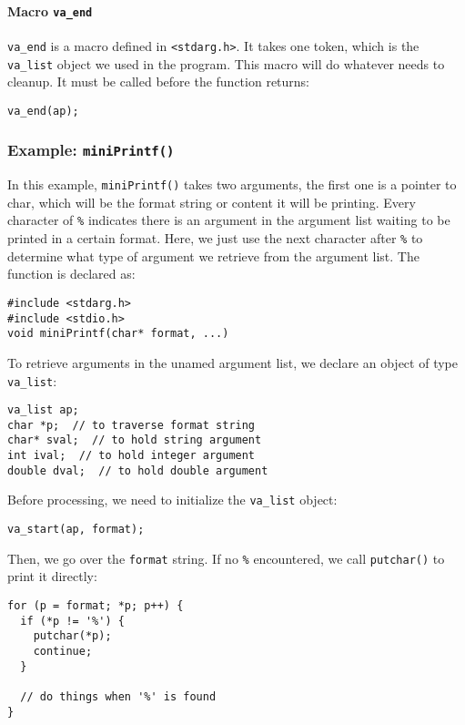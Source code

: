 \documentclass[11pt]{article}
\begin{document}
\paragraph{Macro \texttt{va\_end}}
\label{sec:org6396f16}
\texttt{va\_end} is a macro defined in \texttt{<stdarg.h>}. It takes one token, which is the \texttt{va\_list} object we used in the program. This macro will do whatever needs to cleanup. It must be called before the function returns:
\begin{verbatim}
va_end(ap);
\end{verbatim}

\subsubsection{Example: \texttt{miniPrintf()} \label{orgce675b0}}
\label{sec:org32176ec}
In this example, \texttt{miniPrintf()} takes two arguments, the first one is a pointer to char, which will be the format string or content it will be printing. Every character of \texttt{\%} indicates there is an argument in the argument list waiting to be printed in a certain format. Here, we just use the next character after \texttt{\%} to determine what type of argument we retrieve from the argument list. The function is declared as:
\begin{verbatim}
#include <stdarg.h>
#include <stdio.h>
void miniPrintf(char* format, ...)
\end{verbatim}
To retrieve arguments in the unamed argument list, we declare an object of type \texttt{va\_list}:
\begin{verbatim}
va_list ap;
char *p;  // to traverse format string
char* sval;  // to hold string argument
int ival;  // to hold integer argument
double dval;  // to hold double argument
\end{verbatim}
Before processing, we need to initialize the \texttt{va\_list} object:
\begin{verbatim}
va_start(ap, format);
\end{verbatim}
Then, we go over the \texttt{format} string. If no \texttt{\%} encountered, we call \texttt{putchar()} to print it directly:
\begin{verbatim}
for (p = format; *p; p++) {
  if (*p != '%') {
    putchar(*p);
    continue;
  }

  // do things when '%' is found
}
\end{verbatim}
\end{document}
